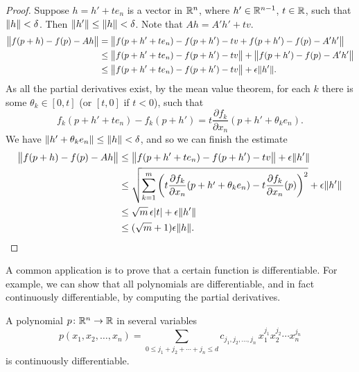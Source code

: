 \begin{proof}
Suppose $h = h' + t e_n$ is a vector in ${\mathbb{R}}^n$, where $h' \in {\mathbb{R}}^{n-1}$,
$t \in {\mathbb{R}}$, such that
$\lVert {h} \rVert < \delta$.  Then $\lVert {h'} \rVert \leq \lVert {h} \rVert < \delta$.
Note that $Ah = A' h' + tv$.
\begin{equation*}
\begin{split}
\bigl\lVert {f(p+h) - f(p) - Ah} \bigr\rVert
&
= \bigl\lVert {f(p+h' + t e_n) - f(p+h') - tv + f(p+h') - f(p) - A' h'} \bigr\rVert
\\
&
\leq \bigl\lVert {f(p+h' + t e_n) - f(p+h') -tv} \bigr\rVert + \bigl\lVert {f(p+h') - f(p) -
A' h'} \bigr\rVert
\\
&
\leq \bigl\lVert {f(p+h' + t e_n) - f(p+h') -tv} \bigr\rVert + \epsilon \lVert {h'} \rVert .
\end{split}
\end{equation*}
As all the partial derivatives exist, by the mean value theorem,
for each $k$ there is some $\theta_k \in [0,t]$ (or $[t,0]$ if $t < 0$), such that
\begin{equation*}
f_k(p+h' + t e_n) - f_k(p+h') =
t \frac{\partial f_k}{\partial x_n}(p+h'+\theta_k e_n).
\end{equation*}
We have $\lVert {h'+\theta_k e_n} \rVert \leq \lVert {h} \rVert < \delta$,
and so we can finish the estimate
\begin{equation*}
\begin{split}
\bigl\lVert {f(p+h) - f(p) - Ah} \bigr\rVert
& \leq \bigl\lVert {f(p+h' + t e_n) - f(p+h') -tv} \bigr\rVert + \epsilon \lVert {h'} \rVert
\\
& \leq \sqrt{\sum_{k=1}^m {\left(t\frac{\partial f_k}{\partial x_n}(p+h'+\theta_k e_n) -
t \frac{\partial f_k}{\partial x_n}(p)\right)}^2} + \epsilon \lVert {h'} \rVert
\\
& \leq \sqrt{m}\, \epsilon \lvert {t} \rvert + \epsilon \lVert {h'} \rVert
\\
& \leq (\sqrt{m}+1)\epsilon \lVert {h} \rVert . \qedhere
\end{split}
\end{equation*}
\end{proof}

A common application is to prove that a certain function is
differentiable.  For example, we can show that all polynomials
are differentiable, and in fact continuously differentiable,
by computing the partial derivatives.

\begin{cor}
A polynomial $p \colon {\mathbb{R}}^n \to {\mathbb{R}}$ in several variables
\begin{equation*}
p(x_1,x_2,\ldots,x_n)
=
\sum_{0 \leq j_1+j_2+\cdots+j_n \leq d}
c_{j_1,j_2,\ldots,j_n}
\,
x_1^{j_1}
x_2^{j_2}
\cdots
x_n^{j_n}
\end{equation*}
is continuously differentiable.
\end{cor}

